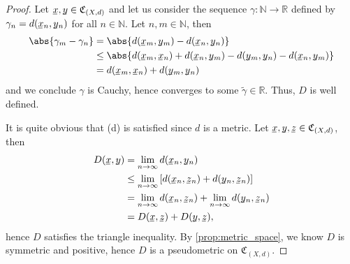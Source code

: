 \begin{proof}
    Let \(\sequnder{x}, \sequnder{y} \in \mathfrak{C}_{(X,d)}\) and let us consider the sequence \(\gamma : \mathbb{N} \to \mathbb{R}\) defined by \(\gamma_n = d(\sequnder{x}_n, \sequnder{y}_n)\) for all \(n \in \mathbb{N}\). Let \(n, m \in \mathbb{N}\), then
    \begin{align*}
        \abs{\gamma_m - \gamma_n} &= \abs{d(\sequnder{x}_m, \sequnder{y}_m) - d(\sequnder{x}_n, \sequnder{y}_n)}\\
                                  &\leq \abs{d(\sequnder{x}_m, \sequnder{x}_n) + d(\sequnder{x}_n, \sequnder{y}_m) - d(\sequnder{y}_m, \sequnder{y}_n) - d(\sequnder{x}_n, \sequnder{y}_m)}\\
                                  &= d(\sequnder{x}_m, \sequnder{x}_n) + d(\sequnder{y}_m, \sequnder{y}_n)
    \end{align*}
    and we conclude \(\gamma\) is Cauchy, hence converges to some \(\tilde{\gamma} \in \mathbb{R}\). Thus, \(D\) is well defined. 

    It is quite obvious that (d) is satisfied since \(d\) is a metric. Let \(\sequnder{x}, \sequnder{y}, \sequnder{z} \in \mathfrak{C}_{(X,d)}\), then
    \begin{align*}
        D(\sequnder{x},\sequnder{y}) &= \lim_{n\to\infty}{d(\sequnder{x}_n,\sequnder{y}_n)}\\
               &\leq \lim_{n\to\infty}{\left[d(\sequnder{x}_n, \sequnder{z}_n) +d(\sequnder{y}_n, \sequnder{z}_n)\right]}\\
               &= \lim_{n\to\infty}{d(\sequnder{x}_n,\sequnder{z}_n)} + \lim_{n\to\infty}{d(\sequnder{y}_n,\sequnder{z}_n)}\\
               &= D(\sequnder{x},\sequnder{z}) + D(\sequnder{y},\sequnder{z}),
    \end{align*}
    hence \(D\) satisfies the triangle inequality. By \cref{prop:metric_space}, we know \(D\) is symmetric and positive, hence \(D\) is a pseudometric on \(\mathfrak{C}_{(X,d)}\).
\end{proof}

